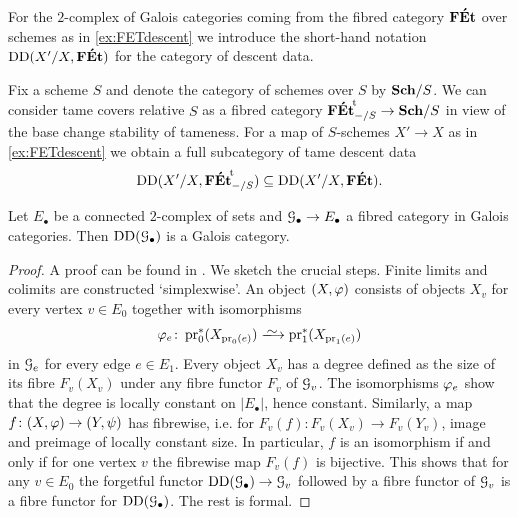 \begin{ex}
For the $2$-complex of Galois categories coming from the fibred category $\mathbf{F\acute{E}t}$ over schemes as in \cref{ex:FETdescent} we introduce the short-hand notation $\operatorname{DD}(X'/X, \mathbf{F\acute{E}t})$ for the category of descent data. 

Fix a scheme $S$ and denote the category of schemes over $S$ by $\mathbf{Sch}/S$. We can consider tame covers relative $S$ as a fibred category ${\mathbf{F\acute{E}t}}^{\!\mathrm{t}}_{-/S} \to \mathbf{Sch}/S$ in view of the base change stability of tameness. 
For a map of $S$-schemes $X'\to X$ as in \cref{ex:FETdescent} we obtain a full subcategory of tame descent data
\[
    \operatorname{DD}(X'/X, {\mathbf{F\acute{E}t}}^{\!\mathrm{t}}_{-/S}) \subseteq \operatorname{DD}(X'/X, \mathbf{F\acute{E}t}).
\]
\end{ex}

\begin{prop}
\label{prop:DD is galois for connected E}
    Let $E_\bullet$ be a connected $2$-complex of sets and ${\mathcal G}_\bullet \to E_\bullet$ a fibred category in Galois categories. Then $\operatorname{DD}({\mathcal G}_\bullet)$ is a Galois category.
\end{prop}

\begin{proof}
    A proof can be found in 
    \cite[Propositions~2.4,~4.4]{Stix2006:vanKampen}. We sketch the crucial steps. Finite limits and colimits are constructed `simplexwise'.  
    An object $(X,\varphi)$ consists of objects $X_v$ for every vertex $v \in E_0$ together with isomorphisms 
    \[
    \ph_e\colon  \pr_0^\ast(X_{\pr_0(e)}) \isomto \pr_1^\ast(X_{\pr_1(e)})
    \]
    in ${\mathcal G}_e$ for every edge $e \in E_1$. Every object $X_v$ has a degree defined as the size of its fibre $F_v(X_v)$ under any fibre functor $F_v$ of ${\mathcal G}_v$. The isomorphisms $\varphi_e$ show that the degree is locally constant on $|E_\bullet|$, hence constant. Similarly, a map $f \colon (X,\varphi) \to (Y, \psi)$ has fibrewise, i.e. for $F_v(f) \colon F_v(X_v) \to F_v(Y_v)$, image and preimage of locally constant size. In particular, $f$ is an isomorphism if and only if for one vertex $v$ the fibrewise map $F_v(f)$ is bijective. This shows that for any $v \in E_0$ the forgetful functor $\operatorname{DD}({\mathcal G}_\bullet) \to {\mathcal G}_v$ followed by a fibre functor of ${\mathcal G}_v$ is a fibre functor for $\operatorname{DD}({\mathcal G}_\bullet)$. The rest is formal. 
\end{proof}

